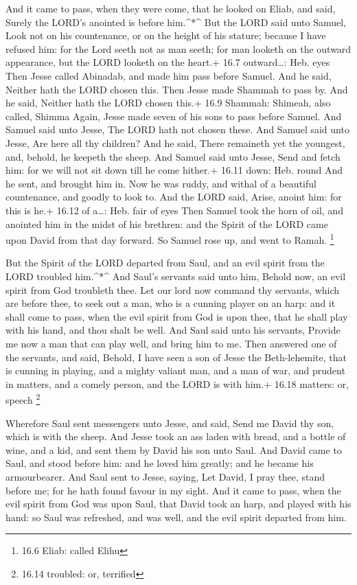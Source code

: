  And it came to pass, when they were come, that he looked on
Eliab, and said, Surely the LORD's anointed is before him.\^{}*\^{}
 But the LORD said unto Samuel, Look not on his countenance,
or on the height of his stature; because I have refused him: for the
Lord seeth not as man seeth; for man looketh on the outward appearance,
but the LORD looketh on the heart.+ 16.7 outward\ldots: Heb. eyes
 Then Jesse called Abinadab, and made him pass before
Samuel. And he said, Neither hath the LORD chosen this. 
Then Jesse made Shammah to pass by. And he said, Neither hath the LORD
chosen this.+ 16.9 Shammah: Shimeah, also called, Shimma 
Again, Jesse made seven of his sons to pass before Samuel. And Samuel
said unto Jesse, The LORD hath not chosen these.  And
Samuel said unto Jesse, Are here all thy children? And he said, There
remaineth yet the youngest, and, behold, he keepeth the sheep. And
Samuel said unto Jesse, Send and fetch him: for we will not sit down
till he come hither.+ 16.11 down: Heb. round  And he sent,
and brought him in. Now he was ruddy, and withal of a beautiful
countenance, and goodly to look to. And the LORD said, Arise, anoint
him: for this is he.+ 16.12 of a\ldots: Heb. fair of eyes 
Then Samuel took the horn of oil, and anointed him in the midst of his
brethren: and the Spirit of the LORD came upon David from that day
forward. So Samuel rose up, and went to Ramah. \footnote{16.6 Eliab:
  called Elihu}

 But the Spirit of the LORD departed from Saul, and an evil
spirit from the LORD troubled him.\^{}*\^{}  And Saul's
servants said unto him, Behold now, an evil spirit from God troubleth
thee.  Let our lord now command thy servants, which are
before thee, to seek out a man, who is a cunning player on an harp: and
it shall come to pass, when the evil spirit from God is upon thee, that
he shall play with his hand, and thou shalt be well.  And
Saul said unto his servants, Provide me now a man that can play well,
and bring him to me.  Then answered one of the servants,
and said, Behold, I have seen a son of Jesse the Beth-lehemite, that is
cunning in playing, and a mighty valiant man, and a man of war, and
prudent in matters, and a comely person, and the LORD is with him.+
16.18 matters: or, speech \footnote{16.14 troubled: or, terrified}

 Wherefore Saul sent messengers unto Jesse, and said, Send
me David thy son, which is with the sheep.  And Jesse took
an ass laden with bread, and a bottle of wine, and a kid, and sent them
by David his son unto Saul.  And David came to Saul, and
stood before him: and he loved him greatly; and he became his
armourbearer.  And Saul sent to Jesse, saying, Let David, I
pray thee, stand before me; for he hath found favour in my sight.
 And it came to pass, when the evil spirit from God was
upon Saul, that David took an harp, and played with his hand: so Saul
was refreshed, and was well, and the evil spirit departed from him.

